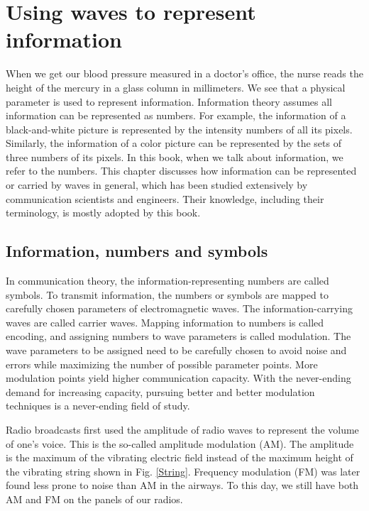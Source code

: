 \documentclass[oneside, letter, 12pt]{book}
\begin{document}
\chapter{Using waves to represent information}\label{c-modulation}
When we get our blood pressure measured in a doctor's office, the nurse reads the height of the mercury in a glass column in millimeters. We see that a physical parameter is used to represent information. Information theory assumes all information can be represented as numbers. For example, the information of a black-and-white picture is represented by the intensity numbers of all its pixels. Similarly, the information of a color picture can be represented by the sets of three numbers of its pixels. In this book, when we talk about information, we refer to the numbers. This chapter discusses how information can be represented or carried by waves in general, which has been studied extensively by communication scientists and engineers. Their knowledge, including their terminology, is mostly adopted by this book.

\section{Information, numbers and symbols}
In communication theory, the information-representing numbers are called symbols. To transmit information, the numbers or symbols are mapped to carefully chosen parameters of electromagnetic waves. The information-carrying waves are called carrier waves. Mapping information to numbers is called encoding, and assigning numbers to wave parameters is called modulation. The wave parameters to be assigned need to be carefully chosen to avoid noise and errors while maximizing the number of possible parameter points. More modulation points yield higher communication capacity. With the never-ending demand for increasing capacity, pursuing better and better modulation techniques is a never-ending field of study.

Radio broadcasts first used the amplitude of radio waves to represent the volume of one's voice. This is the so-called amplitude modulation (AM). The amplitude is the maximum of the vibrating electric field instead of the maximum height of the vibrating string shown in Fig. \ref{String}. Frequency modulation (FM) was later found less prone to noise than AM in the airways. To this day, we still have both AM and FM on the panels of our radios.
\end{document}
